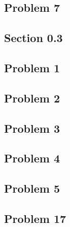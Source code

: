 \documentclass[11pt]{article}
\begin{document}
\subsection*{Problem 7}

\subsection*{Section 0.3}
\subsection*{Problem 1}
\subsection*{Problem 2}
\subsection*{Problem 3}
\subsection*{Problem 4}
\subsection*{Problem 5}
\subsection*{Problem 17}
\end{document}
